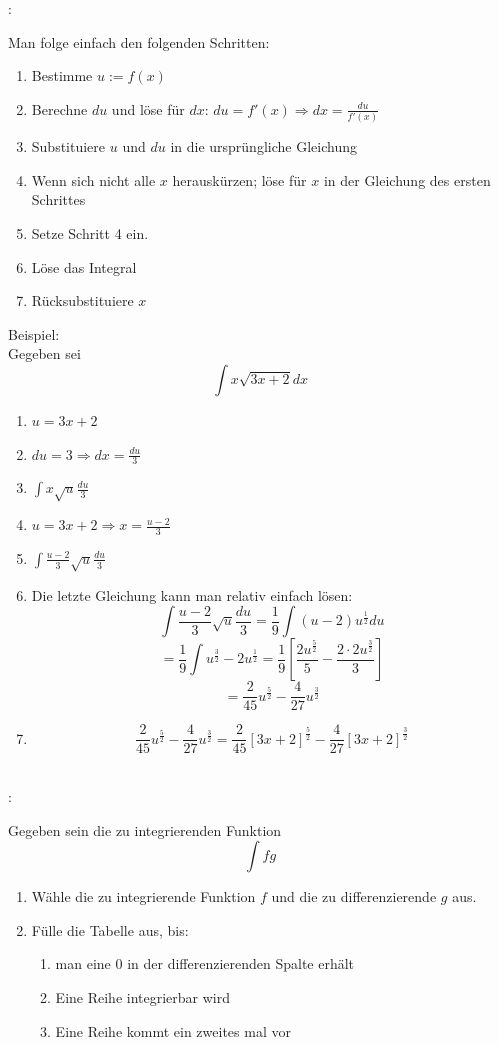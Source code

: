 \documentclass[7pt,landscape, margin = 0.1mm]{article}
\newcommand{\KRZ}[2]{\vspace{1mm} \hline \vspace{1mm} \color{chaptercolor}{RC #1}:\color{black} \   \hspace{0.2cm}\vspace{1mm}   {\begin{minipage}{20em}
#2 \end{minipage}} \vspace{1mm}  \hline \vspace{1mm}  \\}
\begin{document}
\begin{multicols}{4}
\begin{flushleft}
\KRZ{Unbestimmtes Integral mit Substitution}{
Man folge einfach den folgenden Schritten:
\begin{enumerate}
\item Bestimme $u := f(x)$
\item Berechne $du$ und löse für $dx$: $du = f'(x) \Rightarrow dx = \frac{du}{f'(x)}$
\item Substituiere $u$ und $du$ in die ursprüngliche Gleichung
\item Wenn sich nicht alle $x$ herauskürzen; löse für $x$ in der Gleichung des ersten Schrittes
\item Setze Schritt 4 ein.
\item Löse das Integral
\item Rücksubstituiere $x$
\end{enumerate}
Beispiel:\\
Gegeben sei $$\int x \sqrt{3x+2}dx$$
\begin{enumerate}
\item $u = 3x + 2$
\item $du = 3 \Rightarrow dx = \frac{du}{3}$
\item $\int x \sqrt{u} \frac{du}{3}$
\item $u = 3x + 2 \Rightarrow x = \frac{u-2}{3} $
\item $\int \frac{u-2}{3}\sqrt{u} \frac{du}{3}  $
\item
Die letzte Gleichung kann man relativ einfach lösen:
$$ \int \frac{u-2}{3}\sqrt{u} \frac{du}{3}   = \frac{1}{9} \int \left( u-2 \right) u^{\frac{1}{2}} du$$
$$ = \frac{1}{9} \int u^{\frac{3}{2}} - 2 u^{\frac{1}{2}} = \frac{1}{9} \left[\frac{2u^{\frac{5}{2}}}{5} - \frac{2 \cdot 2u^{\frac{3}{2}}}{3}\right]$$
$$ = \frac{2}{45}u^{\frac{5}{2}}-\frac{4}{27}u^{\frac{3}{2}}$$
\item 
$$  \frac{2}{45}u^{\frac{5}{2}}-\frac{4}{27}u^{\frac{3}{2}} = \frac{2}{45} \left[3x+2 \right]^{\frac{5}{2}}-\frac{4}{27}\left[3x+2 \right]^{\frac{3}{2}}$$
\end{enumerate}
}
\KRZ{Partielle Integration: DI-Methode}{
Gegeben sein die zu integrierenden Funktion $$\int f g$$
\begin{enumerate}
\item Wähle die zu integrierende Funktion $f$ und die zu differenzierende $g$ aus.
\item Fülle die Tabelle aus, bis:
\begin{enumerate}
\item man eine $0$ in der differenzierenden Spalte erhält
\item Eine Reihe integrierbar wird
\item Eine Reihe kommt ein zweites mal vor
\end{enumerate}
\begin{center}


\end{center}
\end{enumerate}}
\end{flushleft}
\end{multicols}
\end{document}

